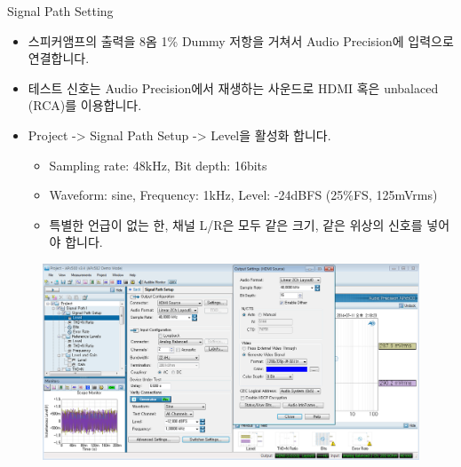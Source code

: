 \documentclass{beamer}
\begin{document}
\begin{frame}[t]{Signal Path Setting}
\begin{itemize}
\item 스피커앰프의 출력을 8옴 1\% Dummy 저항을 거쳐서 Audio Precision에 입력으로 연결합니다.
\item 테스트 신호는 Audio Precision에서 재생하는 사운드로 HDMI 혹은 unbalaced (RCA)를 이용합니다.
\item Project -> Signal Path Setup -> Level을 활성화 합니다.
	\begin{itemize}
	\item Sampling rate: 48kHz, Bit depth: 16bits
	\item Waveform: sine, Frequency: 1kHz, Level: -24dBFS (25\%FS, 125mVrms)
	\item 특별한 언급이 없는 한, 채널 L/R은 모두 같은 크기, 같은 위상의 신호를 넣어야 합니다.
	\end{itemize}
\end{itemize}

\begin{figure}[r]
	\includegraphics[height=0.4\textwidth]{figure/apsetting/signalPath.png}
\end{figure}
\end{frame}
\end{document}
